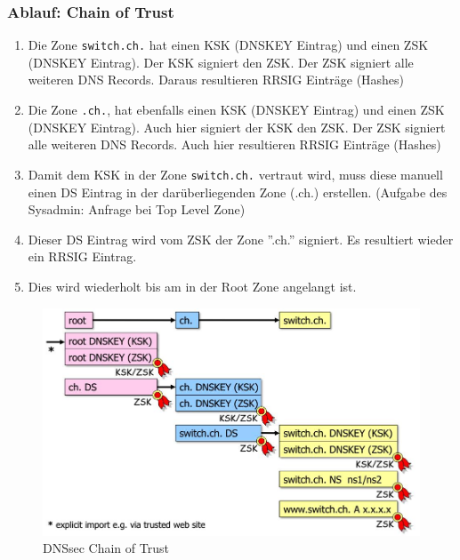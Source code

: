 \clearpage

\subsubsection{Ablauf: Chain of Trust}
\begin{enumerate}
	\item Die Zone \lstinline|switch.ch.| hat einen KSK (DNSKEY Eintrag) und einen ZSK (DNSKEY Eintrag). Der KSK signiert den ZSK. Der ZSK signiert alle weiteren DNS Records. Daraus resultieren RRSIG Einträge (Hashes)
	\item Die Zone \lstinline|.ch.|, hat ebenfalls einen KSK (DNSKEY Eintrag) und einen ZSK (DNSKEY Eintrag). Auch hier signiert der KSK den ZSK. Der ZSK signiert alle weiteren DNS Records. Auch hier resultieren RRSIG Einträge (Hashes)
	\item Damit dem KSK in der Zone \lstinline|switch.ch.| vertraut wird, muss diese manuell einen DS Eintrag in der darüberliegenden Zone (.ch.) erstellen. (Aufgabe des Sysadmin: Anfrage bei Top Level Zone)
	\item Dieser DS Eintrag wird vom ZSK der Zone ''.ch.'' signiert. Es resultiert wieder ein RRSIG Eintrag.
	\item Dies wird wiederholt bis am in der Root Zone angelangt ist.
\end{enumerate}

\begin{figure}[h!]
	\centering
	\includegraphics[width=0.9\linewidth]{images/dnssec_chainoftrust}
	\caption{DNSsec Chain of Trust}
	\label{fig:dnssecchainoftrust}
\end{figure}

\clearpage


